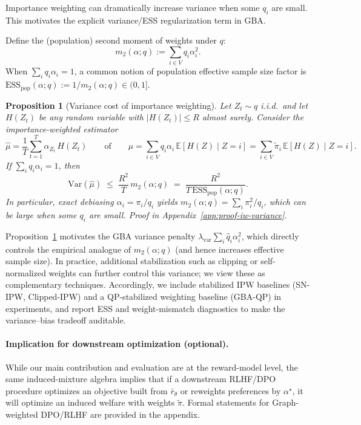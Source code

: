 \documentclass{article}
\theoremstyle{plain}
\newtheorem{proposition}[theorem]{Proposition}
\theoremstyle{definition}
\theoremstyle{remark}
\begin{document}
Importance weighting can dramatically increase variance when some $q_i$ are
small. This motivates the explicit variance/ESS regularization term in GBA.

Define the (population) second moment of weights under $q$:
\begin{equation}
    m_2(\alpha;q) := \sum_{i\in V} q_i \alpha_i^2.
\end{equation}
When $\sum_i q_i\alpha_i=1$, a common notion of population effective sample size
factor is $\mathrm{ESS}_{\mathrm{pop}}(\alpha;q):=1/m_2(\alpha;q)\in(0,1]$.

\begin{proposition}[Variance cost of importance weighting]
\label{prop:iw-variance}
Let $Z_t\sim q$ i.i.d.\ and let $H(Z_t)$ be any random variable with
$|H(Z_t)|\le R$ almost surely. Consider the importance-weighted estimator
\[
\widehat{\mu}
=
\frac{1}{T}\sum_{t=1}^T \alpha_{Z_t}\,H(Z_t)
\qquad\text{of}\qquad
\mu
=
\sum_{i\in V} q_i\alpha_i\,\mathbb{E}[H(Z)\mid Z=i]
=
\sum_{i\in V}\tilde\pi_i\,\mathbb{E}[H(Z)\mid Z=i].
\]
If $\sum_i q_i\alpha_i=1$, then
\begin{equation}
    \mathrm{Var}(\widehat{\mu})
    \;\le\;
    \frac{R^2}{T}\, m_2(\alpha;q)
    \;=\;
    \frac{R^2}{T\,\mathrm{ESS}_{\mathrm{pop}}(\alpha;q)}.
\end{equation}
In particular, exact debiasing $\alpha_i=\pi_i/q_i$ yields
$m_2(\alpha;q)=\sum_i \pi_i^2/q_i$, which can be large when some $q_i$ are small.
Proof in Appendix~\ref{app:proof-iw-variance}.
\end{proposition}

Proposition~\ref{prop:iw-variance} motivates the GBA variance penalty
$\lambda_{\mathrm{var}}\sum_i \hat q_i\alpha_i^2$, which directly controls the
empirical analogue of $m_2(\alpha;q)$ (and hence increases effective sample
size). In practice, additional stabilization such as clipping or self-normalized
weights can further control this variance; we view these as complementary
techniques. Accordingly, we include stabilized IPW baselines (SN-IPW, Clipped-IPW)
and a QP-stabilized weighting baseline (GBA-QP) in experiments, and report ESS and
weight-mismatch diagnostics to make the variance--bias tradeoff auditable.

\paragraph{Implication for downstream optimization (optional).}
While our main contribution and evaluation are at the reward-model level,
the same induced-mixture algebra implies that if a downstream RLHF/DPO procedure
optimizes an objective built from $\bar r_\theta$ or reweights preferences by
$\alpha^\star$, it will optimize an induced welfare with weights $\tilde\pi$.
Formal statements for Graph-weighted DPO/RLHF are provided in the appendix.
\end{document}
